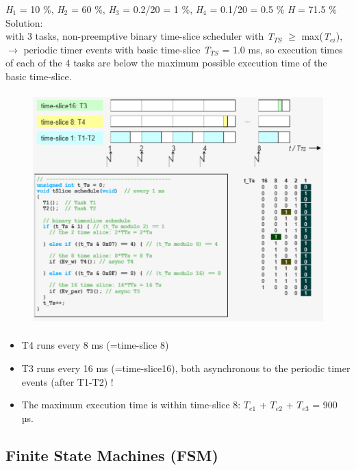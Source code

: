 \begin{enumerate}
\textit{ H}${}_{1}$ = 10 \%, \textit{H}${}_{2}$ = 60 \%, \textit{H}${}_{3}$ = 0.2/20 = 1 \%, \textit{H}${}_{4}$ = 0.1/20 = 0.5 \%  \textit{H} = 71.5 \%\\

Solution:\\
with 3 tasks, non-preemptive binary time-slice scheduler with \textit{T${}_{TS}$} $\mathrm{\ge}$ max(\textit{T${}_{ei}$}), \\

$\rightarrow$ periodic timer events with basic time-slice \textit{T${}_{TS}$} = 1.0 ms, so execution times of each of the 4 tasks are below the maximum possible execution time of the basic time-slice.

	\begin{figure}[h]
    \centering
    \includegraphics[width=14cm, height=9cm]{Images/image157.png}
    \label{fig:Fig }
    \end{figure}
\newpage    
\begin{itemize}
\item T4 runs every 8 ms (=time-slice 8)
\item T3 runs every 16 ms (=time-slice16), both asynchronous to the periodic timer events  (after T1-T2) !
\item The maximum execution time is within time-slice 8: $T_{e1}$ + $T_{e2}$ + $T_{e3}$ = 900 µs.
\end{itemize}
\end{enumerate} 

\subsection{Finite State Machines (FSM)}

